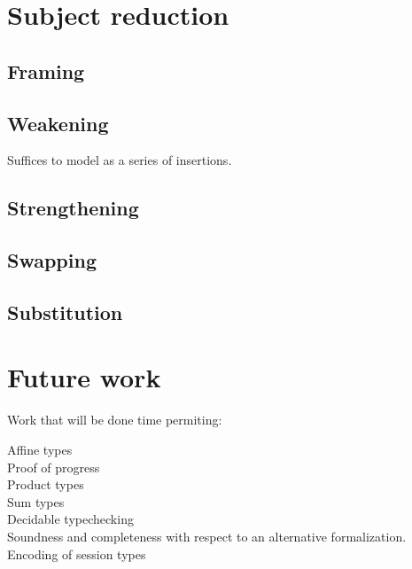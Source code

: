 \documentclass[a4paper,UKenglish,cleveref, autoref, thm-restate,authorcolumns]{lipics-v2019}
\begin{document}
\section{Subject reduction}

\subsection{Framing}


\subsection{Weakening}

Suffices to model as a series of insertions.

\subsection{Strengthening}

\subsection{Swapping}

\subsection{Substitution}

\section{Future work}

Work that will be done time permiting:

\begin{description}

\item [Affine types]
  
\item [Proof of progress]

\item [Product types]

\item [Sum types]

\item [Decidable typechecking]

\item [Soundness and completeness with respect to an alternative formalization.]

\item [Encoding of session types]

\end{description}



\end{document}
